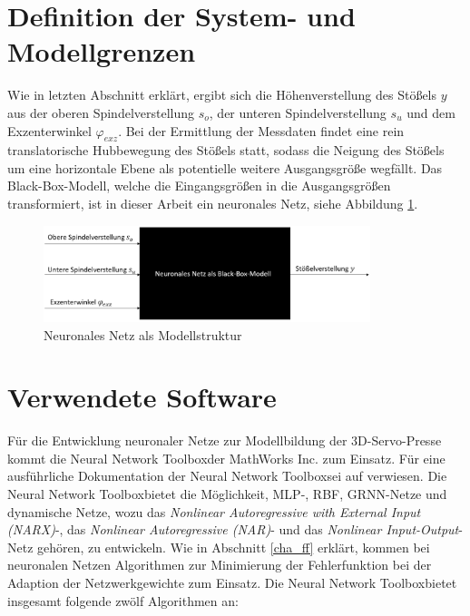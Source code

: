 \section{Definition der System- und Modellgrenzen}


Wie in letzten Abschnitt erklärt, ergibt sich die Höhenverstellung des Stößels $y$ aus der oberen Spindelverstellung $s_o$, der unteren Spindelverstellung $s_u$ und dem Exzenterwinkel $\varphi_{exz}$. Bei der Ermittlung der Messdaten findet eine rein translatorische Hubbewegung des Stößels statt, sodass die Neigung des Stößels um eine horizontale Ebene als potentielle weitere Ausgangsgröße wegfällt. Das Black-Box-Modell, welche die Eingangsgrößen in die Ausgangsgrößen transformiert, ist in dieser Arbeit ein  neuronales Netz, siehe Abbildung \ref{fig:blackbox}.

\begin{figure} [H]
	\centering
	\includegraphics[width=0.85\textwidth]{images/blackbox}
	\caption{Neuronales Netz als Modellstruktur}
	\label{fig:blackbox}
\end{figure}


\section{Verwendete Software}
Für die Entwicklung neuronaler Netze zur Modellbildung der 3D-Servo-Presse kommt die Neural Network Toolbox\texttrademark  der MathWorks Inc. zum Einsatz. Für eine ausführliche Dokumentation der Neural Network Toolbox\texttrademark  sei auf \cite{Beale.2018} verwiesen. Die Neural Network Toolbox\texttrademark bietet die Möglichkeit, MLP-, RBF, GRNN-Netze und dynamische Netze, wozu das \textit{Nonlinear Autoregressive with External Input (NARX)}-, das \textit{Nonlinear Autoregressive (NAR)}- und das \textit{Nonlinear Input-Output}-Netz gehören, zu entwickeln. Wie in Abschnitt \ref{cha_ff} erklärt, kommen bei neuronalen Netzen Algorithmen zur Minimierung der Fehlerfunktion bei der Adaption der Netzwerkgewichte zum Einsatz. Die Neural Network Toolbox\texttrademark bietet insgesamt folgende zwölf Algorithmen an:

